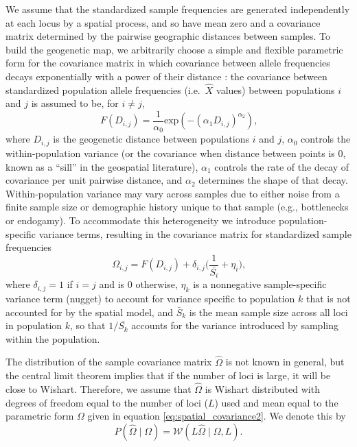 \documentclass[10pt,letterpaper]{article}
\newcommand{\given}{\mid}
\begin{document}
We assume that the standardized sample frequencies are generated independently at each locus by a spatial process,
and so have mean zero and a covariance matrix determined by the pairwise geographic distances between samples. 
To build the geogenetic map, we arbitrarily choose a simple and flexible parametric form for the covariance matrix 
in which covariance between allele frequencies decays exponentially with a power of their distance
\cite{Diggle1998, Wasser2004, Bradburd2013}:
the covariance between standardized population allele frequencies (i.e.~$\hat X$ values) between populations $i$ and $j$ is assumed to be, for $i \neq j$,
\begin{equation}
\label{eq:spatial_covariance}
F(D_{i,j}) = \frac{1}{\alpha_0} \text{exp} \left(	-\left(\alpha_1 D_{i,j} \right)^{\alpha_2} \right) \text{,}
\end{equation}
where $D_{i,j}$ is the geogenetic distance between populations $i$ and $j$, 
$\alpha_0$ controls the within-population variance 
(or the covariance when distance between points is 0, known as a ``sill'' in the geospatial literature),
$\alpha_1$ controls the rate of the decay of covariance per unit pairwise distance, and $\alpha_2$ determines the shape of that decay.  
Within-population variance may vary across samples due to either noise from a finite sample size or demographic history unique to that sample (e.g., bottlenecks or endogamy).  
To accommodate this heterogeneity we introduce population-specific variance terms,
resulting in the covariance matrix for standardized sample frequencies
\begin{equation}
\label{eq:spatial_covariance2}
\Omega_{i,j} =F(D_{i,j}) + \delta_{i,j} \big(\frac{1}{\bar{S_{i}}} + \eta_{i} \big) \text{,}
\end{equation} 
where $\delta_{i,j}=1$ if $i=j$ and is $0$ otherwise,
$\eta_k$ is a nonnegative sample-specific variance term (nugget) to account for variance specific to population $k$ that is not accounted for by the spatial model,
and $\bar{S}_k$ is the mean sample size across all loci in population $k$,
so that $1/\bar{S_k}$ accounts for the variance introduced by sampling within the population.

The distribution of the sample covariance matrix $\hat \Omega$ is not known in general,
but the central limit theorem implies that if the number of loci is large, it will be close to Wishart.
Therefore, we assume that $\hat \Omega$ 
is Wishart distributed with degrees of freedom equal to the number of loci ($L$) used
and mean equal to the parametric form $\Omega$ given in equation \eqref{eq:spatial_covariance2}.
We denote this by
\begin{equation}
\label{eq:wishart_dist}
P(\widehat{\Omega} \given \Omega) = \mathcal{W}\left( L\widehat{\Omega} \mid \Omega, L \right) .
\end{equation}
\end{document}
